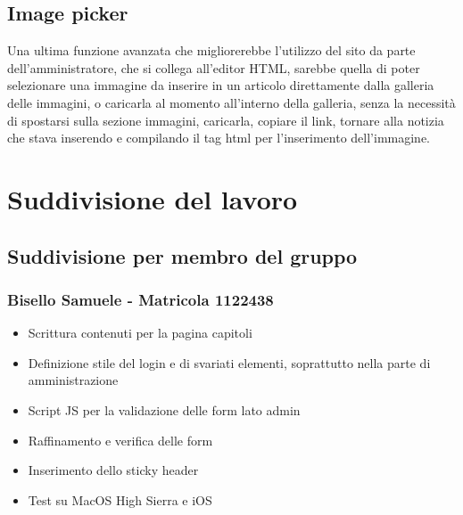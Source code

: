 \documentclass[openany, a4paper, 12pt]{report}
\begin{document}
		\section{Image picker}
		Una ultima funzione avanzata che migliorerebbe l'utilizzo del sito da parte dell'amministratore, che si collega all'editor HTML, sarebbe quella di poter selezionare una immagine da inserire in un articolo direttamente dalla galleria delle immagini, o caricarla al momento all'interno della galleria, senza la necessità di spostarsi sulla sezione immagini, caricarla, copiare il link, tornare alla notizia che stava inserendo e compilando il tag html per l'inserimento dell'immagine.



	\chapter{Suddivisione del lavoro}
	\section{Suddivisione per membro del gruppo}
	\subsection{Bisello Samuele - Matricola 1122438}
	\begin{itemize}
		\item Scrittura contenuti per la pagina capitoli
		\item Definizione stile del login e di svariati elementi, soprattutto nella parte di amministrazione
		\item Script JS per la validazione delle form lato admin
		\item Raffinamento e verifica delle form
		\item Inserimento dello sticky header
		\item Test su MacOS High Sierra e iOS
	\end{itemize}
\end{document}
